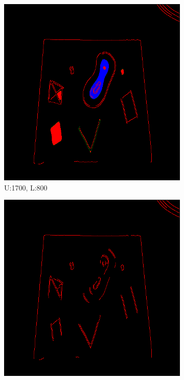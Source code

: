 \documentclass[11pt]{article}
\begin{document}
\begin{figure}[H]
\centering
	\begin{subfigure}[t]{.25\textwidth}
		\centering
		\includegraphics[scale=0.3]{pics/normalThreshTest/Upper1700lower800kernel5.png}
		\caption{U:1700, L:800}
	\end{subfigure}
\hfill
	\begin{subfigure}[t]{.25\textwidth}
		\centering
		\includegraphics[scale=0.3]{pics/normalThreshTest/Upper1700lower1200kernel5.png}

\end{subfigure}
\end{figure}
\end{document}
